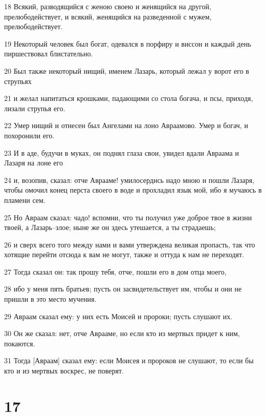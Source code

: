 \par 18 Всякий, разводящийся с женою своею и женящийся на другой, прелюбодействует, и всякий, женящийся на разведенной с мужем, прелюбодействует.
\par 19 Некоторый человек был богат, одевался в порфиру и виссон и каждый день пиршествовал блистательно.
\par 20 Был также некоторый нищий, именем Лазарь, который лежал у ворот его в струпьях
\par 21 и желал напитаться крошками, падающими со стола богача, и псы, приходя, лизали струпья его.
\par 22 Умер нищий и отнесен был Ангелами на лоно Авраамово. Умер и богач, и похоронили его.
\par 23 И в аде, будучи в муках, он поднял глаза свои, увидел вдали Авраама и Лазаря на лоне его
\par 24 и, возопив, сказал: отче Аврааме! умилосердись надо мною и пошли Лазаря, чтобы омочил конец перста своего в воде и прохладил язык мой, ибо я мучаюсь в пламени сем.
\par 25 Но Авраам сказал: чадо! вспомни, что ты получил уже доброе твое в жизни твоей, а Лазарь--злое; ныне же он здесь утешается, а ты страдаешь;
\par 26 и сверх всего того между нами и вами утверждена великая пропасть, так что хотящие перейти отсюда к вам не могут, также и оттуда к нам не переходят.
\par 27 Тогда сказал он: так прошу тебя, отче, пошли его в дом отца моего,
\par 28 ибо у меня пять братьев; пусть он засвидетельствует им, чтобы и они не пришли в это место мучения.
\par 29 Авраам сказал ему: у них есть Моисей и пророки; пусть слушают их.
\par 30 Он же сказал: нет, отче Аврааме, но если кто из мертвых придет к ним, покаются.
\par 31 Тогда [Авраам] сказал ему: если Моисея и пророков не слушают, то если бы кто и из мертвых воскрес, не поверят.

\chapter{17}

